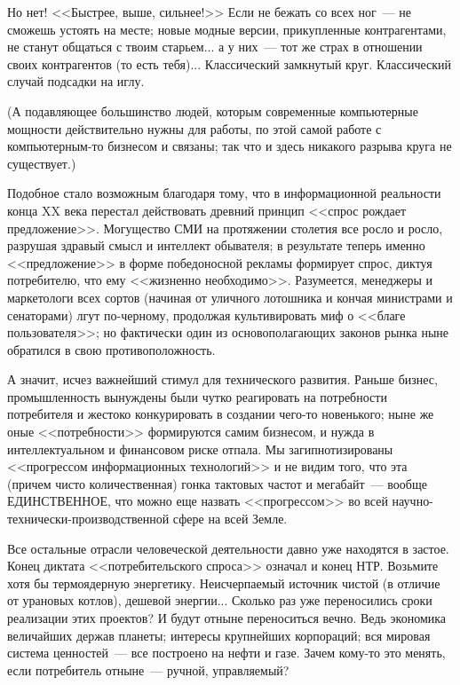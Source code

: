 \documentclass{scrbook}
\newcommand{\flqq}{<<}
\newcommand{\frqq}{>>}
\newcommand{\mdash}{~--- }
\begin{document}
Но нет! {\flqq}Быстрее, выше, сильнее!{\frqq} Если не бежать со всех ног{\mdash}не сможешь устоять на месте; новые модные версии, прикупленные контрагентами, не станут общаться с твоим старьем... а у них{\mdash}тот же страх в отношении своих контрагентов (то есть тебя)... Классический замкнутый круг. Классический случай подсадки на иглу.

(А подавляющее большинство людей, которым современные компьютерные мощности действительно нужны для работы, по этой самой работе с компьютерным-то бизнесом и связаны; так что и здесь никакого разрыва круга не существует.)

Подобное стало возможным благодаря тому, что в информационной реальности конца XX века перестал действовать древний принцип {\flqq}спрос рождает предложение{\frqq}. Могущество СМИ на протяжении столетия все росло и росло, разрушая здравый смысл и интеллект обывателя; в результате теперь именно {\flqq}предложение{\frqq} в форме победоносной рекламы формирует спрос, диктуя потребителю, что ему {\flqq}жизненно необходимо{\frqq}. Разумеется, менеджеры и маркетологи всех сортов (начиная от уличного лотошника и кончая министрами и сенаторами) лгут по-черному, продолжая культивировать миф о {\flqq}благе пользователя{\frqq}; но фактически один из основополагающих законов рынка ныне обратился в свою противоположность.

А значит, исчез важнейший стимул для технического развития. Раньше бизнес, промышленность вынуждены были чутко реагировать на потребности потребителя и жестоко конкурировать в создании чего-то новенького; ныне же оные {\flqq}потребности{\frqq} формируются самим бизнесом, и нужда в интеллектуальном и финансовом риске отпала. Мы загипнотизированы {\flqq}прогрессом информационных технологий{\frqq} и не видим того, что эта (причем чисто количественная) гонка тактовых частот и мегабайт{\mdash}вообще ЕДИНСТВЕННОЕ, что можно еще назвать {\flqq}прогрессом{\frqq} во всей научно-технически-производственной сфере на всей Земле.

Все остальные отрасли человеческой деятельности давно уже находятся в застое. Конец диктата {\flqq}потребительского спроса{\frqq} означал и конец НТР. Возьмите хотя бы термоядерную энергетику. Неисчерпаемый источник чистой (в отличие от урановых котлов), дешевой энергии... Сколько раз уже переносились сроки реализации этих проектов? И будут отныне переноситься вечно. Ведь экономика величайших держав планеты; интересы крупнейших корпораций; вся мировая система ценностей{\mdash}все построено на нефти и газе. Зачем кому-то это менять, если потребитель отныне{\mdash}ручной, управляемый?
\end{document}
